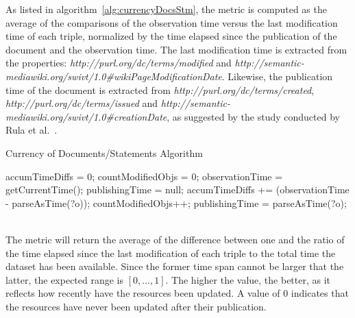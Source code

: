 As listed in algorithm~\ref{alg:currencyDocsStm}, the metric is computed as the average of the comparisons of the observation time versus the last modification time of each triple, normalized by the time elapsed since the publication of the document and the observation time. The last modification time is extracted from the properties: \textit{http://purl.org/dc/terms/modified} and \textit{http://semantic-mediawiki.org/swivt/1.0\#wikiPageModificationDate}. Likewise, the publication time of the document is extracted from \textit{http://purl.org/dc/terms/created}, \textit{http://purl.org/dc/terms/issued} and \textit{http://semantic-mediawiki.org/swivt/1.0\#creationDate}, as suggested by the study conducted by Rula et al.~\cite{Rula2012}.
\begin{algorithm}
\caption{Currency of Documents/Statements Algorithm} \label{alg:currencyDocsStm}
\begin{algorithmic}[1]
\State accumTimeDiffs = 0;
\State countModifiedObjs = 0;
\State observationTime = getCurrentTime();
\State publishingTime = null;
\EndProcedure
{}
\State accumTimeDiffs += (observationTime - parseAsTime(?o));
\State countModifiedObjs++;
\EndIf
{} 
\State publishingTime = parseAsTime(?o);
\EndIf ~\\
\EndProcedure
\end{algorithmic}
\end{algorithm}
The metric will return the average of the difference between one and the ratio of the time elapsed since the last modification of each triple to the total time the dataset has been available. Since the former time span cannot be larger that the latter, the expected range is $[0,\ldots,1]$. The higher the value, the better, as it reflects how recently have the resources been updated. A value of 0 indicates that the resources have never been updated after their publication.


